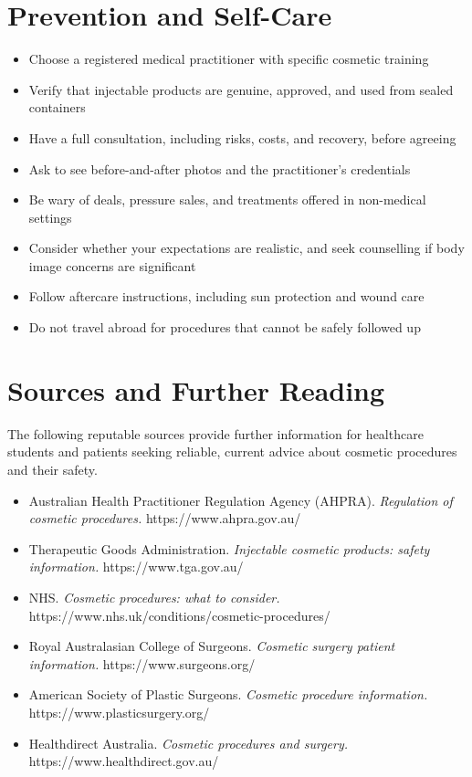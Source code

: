 \section*{Prevention and Self-Care}
\begin{itemize}
    \item Choose a registered medical practitioner with specific cosmetic training
    \item Verify that injectable products are genuine, approved, and used from sealed containers
    \item Have a full consultation, including risks, costs, and recovery, before agreeing
    \item Ask to see before-and-after photos and the practitioner's credentials
    \item Be wary of deals, pressure sales, and treatments offered in non-medical settings
    \item Consider whether your expectations are realistic, and seek counselling if body image concerns are significant
    \item Follow aftercare instructions, including sun protection and wound care
    \item Do not travel abroad for procedures that cannot be safely followed up
\end{itemize}

\section*{Sources and Further Reading}
The following reputable sources provide further information for healthcare students and patients seeking reliable, current advice about cosmetic procedures and their safety.

\begin{itemize}
    \item Australian Health Practitioner Regulation Agency (AHPRA). \textit{Regulation of cosmetic procedures.} https://www.ahpra.gov.au/
    \item Therapeutic Goods Administration. \textit{Injectable cosmetic products: safety information.} https://www.tga.gov.au/
    \item NHS. \textit{Cosmetic procedures: what to consider.} https://www.nhs.uk/conditions/cosmetic-procedures/
    \item Royal Australasian College of Surgeons. \textit{Cosmetic surgery patient information.} https://www.surgeons.org/
    \item American Society of Plastic Surgeons. \textit{Cosmetic procedure information.} https://www.plasticsurgery.org/
    \item Healthdirect Australia. \textit{Cosmetic procedures and surgery.} https://www.healthdirect.gov.au/
\end{itemize}
